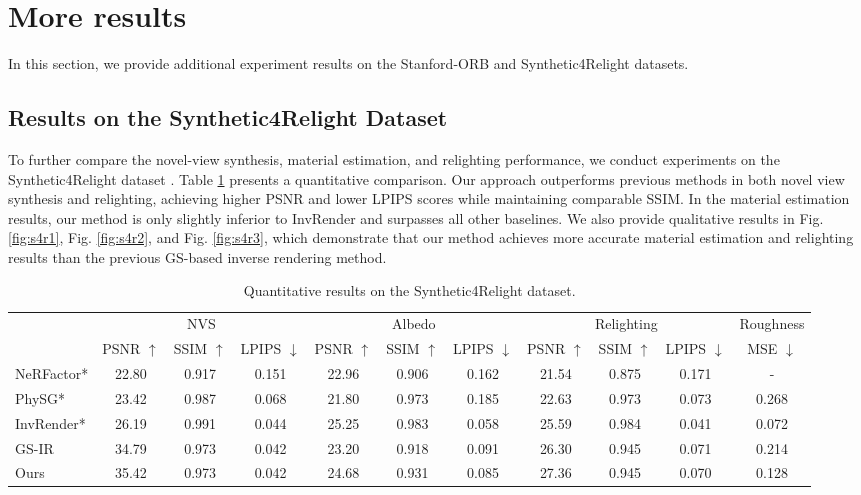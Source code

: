 \documentclass{article} %
\begin{document}
\section{More results}
In this section, we provide additional experiment results on the Stanford-ORB \citep{orb} and Synthetic4Relight \citep{invrender} datasets.
\subsection{Results on the Synthetic4Relight Dataset}
To further compare the novel-view synthesis, material estimation, and relighting performance, we conduct experiments on the Synthetic4Relight dataset \citep{invrender}. Table \ref{tab:S4R} presents a quantitative comparison. Our approach outperforms previous methods in both novel view synthesis and relighting, achieving higher PSNR and lower LPIPS scores while maintaining comparable SSIM. In the material estimation results, our method is only slightly inferior to InvRender \citep{invrender} and surpasses all other baselines. We also provide qualitative results in Fig. \ref{fig:s4r1}, Fig. \ref{fig:s4r2}, and Fig. \ref{fig:s4r3}, which demonstrate that our method achieves more accurate material estimation and relighting results than the previous GS-based inverse rendering method.

\begin{table}[t]
    \footnotesize 
    \centering
    \setlength{\tabcolsep}{1mm}{}
    \renewcommand{\arraystretch}{1}
    \caption{Quantitative results on the Synthetic4Relight dataset.} 
    \label{tab:S4R}
    \begin{tabular}{lccc|ccc|ccc|c}
         \hline & \multicolumn{3}{c}{NVS } & \multicolumn{3}{c}{   Albedo } & \multicolumn{3}{c}{ Relighting } & Roughness \\
        & PSNR $\uparrow$ & SSIM $\uparrow$ & LPIPS $\downarrow$ & PSNR $\uparrow$ & SSIM $\uparrow$ & LPIPS $\downarrow$ & PSNR $\uparrow$ & SSIM $\uparrow$ & LPIPS $\downarrow$  & MSE $\downarrow$ \\
        \hline 
        NeRFactor* & 22.80 & 0.917 & 0.151 & 22.96 & 0.906 & 0.162 & 21.54 & 0.875 & 0.171 & - \\
        PhySG* & 23.42 &0.987 & 0.068 & 21.80 & 0.973 & 0.185 & 22.63 & 0.973 & 0.073 & 0.268 \\
        InvRender* & 26.19 &0.991 & 0.044 & 25.25 & 0.983 & 0.058 & 25.59 & 0.984 & 0.041 & 0.072 \\
        \hline
        GS-IR & 34.79 & 0.973 & 0.042 & 23.20 & 0.918 & 0.091 & 26.30 & 0.945 & 0.071 & 0.214 \\
        Ours & 35.42 &0.973 & 0.042 & 24.68 & 0.931 & 0.085 & 27.36 & 0.945 & 0.070 & 0.128 \\
        \hline 
    \end{tabular}
\end{table}
\end{document}
